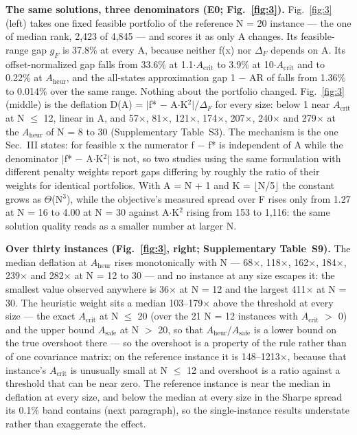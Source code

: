 \documentclass{ieeeaccess}
\begin{document}
\textbf{The same solutions, three denominators (E0; Fig.~\ref{fig:3}).} Fig.~\ref{fig:3} (left) takes one fixed feasible portfolio of the reference N = 20 instance --- the one of median rank, 2,423 of 4,845 --- and scores it as only A changes. Its feasible-range gap $g_{F}$ is 37.8\% at every A, because neither f(x) nor $\Delta_{F}$ depends on A. Its offset-normalized gap falls from 33.6\% at 1.1$\cdot$$A_{\mathrm{crit}}$ to 3.9\% at 10$\cdot$$A_{\mathrm{crit}}$ and to 0.22\% at $A_{\mathrm{heur}}$, and the all-states approximation gap 1 $-$ AR of \cite{ref19} falls from 1.36\% to 0.014\% over the same range. Nothing about the portfolio changed. Fig.~\ref{fig:3} (middle) is the deflation D(A) = $|$f* $-$ A$\cdot$K$^{2}$$|$/$\Delta_{F}$ for every size: below 1 near $A_{\mathrm{crit}}$ at N $\leq$ 12, linear in A, and 57$\times$, 81$\times$, 121$\times$, 174$\times$, 207$\times$, 240$\times$ and 279$\times$ at the $A_{\mathrm{heur}}$ of N = 8 to 30 (Supplementary Table~S3). The mechanism is the one Sec.~III states: for feasible x the numerator f $-$ f* is independent of A while the denominator $|$f* $-$ A$\cdot$K$^{2}$$|$ is not, so two studies using the same formulation with different penalty weights report gaps differing by roughly the ratio of their weights for identical portfolios. With A = N + 1 and K = $\lfloor$N/5$\rfloor$ the constant grows as $\Theta$(N$^{3}$), while the objective's measured spread over F rises only from 1.27 at N = 16 to 4.00 at N = 30 against A$\cdot$K$^{2}$ rising from 153 to 1,116: the same solution quality reads as a smaller number at larger N.


\textbf{Over thirty instances (Fig.~\ref{fig:3}, right; Supplementary Table~S9).} The median deflation at $A_{\mathrm{heur}}$ rises monotonically with N --- 68$\times$, 118$\times$, 162$\times$, 184$\times$, 239$\times$ and 282$\times$ at N = 12 to 30 --- and no instance at any size escapes it: the smallest value observed anywhere is 36$\times$ at N = 12 and the largest 411$\times$ at N = 30. The heuristic weight sits a median 103--179$\times$ above the threshold at every size --- the exact $A_{\mathrm{crit}}$ at N $\leq$ 20 (over the 21 N = 12 instances with $A_{\mathrm{crit}}$ $>$ 0) and the upper bound $A_{\mathrm{safe}}$ at N $>$ 20, so that $A_{\mathrm{heur}}$/$A_{\mathrm{safe}}$ is a lower bound on the true overshoot there --- so the overshoot is a property of the rule rather than of one covariance matrix; on the reference instance it is 148--1213$\times$, because that instance's $A_{\mathrm{crit}}$ is unusually small at N $\leq$ 12 and overshoot is a ratio against a threshold that can be near zero. The reference instance is near the median in deflation at every size, and below the median at every size in the Sharpe spread its 0.1\% band contains (next paragraph), so the single-instance results understate rather than exaggerate the effect.
\end{document}
